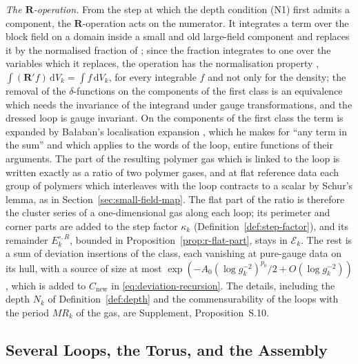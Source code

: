 \documentclass[11pt]{preprint}
\newcommand{\dd}{\mathrm{d}}
\numberwithin{equation}{section}
\theoremstyle{definition}
\theoremstyle{remark}
\theoremstyle{plain}
\begin{document}
\emph{The $\mathbf R$-operation.} From the step at which the depth condition (N1) first admits a component, the $\mathbf R$-operation acts on the numerator. It integrates a term over the block field on a domain inside a small and old large-field component and replaces it by the normalised fraction of \cite[(1.100), p.~201]{BalabanLFR1}; since the fraction integrates to one over the variables which it replaces, the operation has the normalisation property \cite[(1.102), p.~201]{BalabanLFR1}, $\int(\mathbf R'f)\,\dd V_k = \int f\,\dd V_k$, for every integrable $f$ and not only for the density; the removal of the $\delta$-functions on the components of the first class \cite[p.~378]{BalabanLFR2} is an equivalence which needs the invariance of the integrand under gauge transformations, and the dressed loop is gauge invariant. On the components of the first class the term is expanded by Ba{\l}aban's localisation expansion \cite[pp.~372--376, (1.66)--(1.67)]{BalabanLFR2}, which he makes for ``any term in the sum'' and which applies to the words of the loop, entire functions of their arguments. The part of the resulting polymer gas which is linked to the loop is written exactly as a ratio of two polymer gases, and at flat reference data each group of polymers which interleaves with the loop contracts to a scalar by Schur's lemma, as in Section~\ref{sec:small-field-map}. The flat part of the ratio is therefore the cluster series of a one-dimensional gas along each loop; its perimeter and corner parts are added to the step factor $\kappa_k$ (Definition~\ref{def:step-factor}), and its remainder $E^{\circ,R}_k$, bounded in Proposition~\ref{prop:r-flat-part}, stays in $\mathcal E_k$. The rest is a sum of deviation insertions of the class, each vanishing at pure-gauge data on its hull, with a source of size at most $\exp(-A_0(\log g_k^{-2})^{p_0}/2 + O(\log g_k^{-2}))$, which is added to $C_{\mathrm{new}}$ in \eqref{eq:deviation-recursion}. The details, including the depth $N_k$ of Definition~\ref{def:depth} and the commensurability of the loops with the period $MR_k$ of the gas, are Supplement, Proposition~S.10.

\subsection{Several Loops, the Torus, and the Assembly}\label{sec:assembly}
\end{document}
